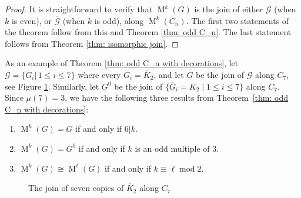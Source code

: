 \documentclass[12pt]{amsart}
\theoremstyle{definition}
\theoremstyle{remark}
\numberwithin{equation}{section}
\numberwithin{figure}{section}
\renewcommand{\mod}{\operatorname{mod}}
\newcommand{\M}{\operatorname{M}}
\begin{document}
\begin{proof}
    It is straightforward to verify that $\M^k(G)$ is the join of either $\mathcal{G}$ (when $k$ is even), or $\overline{\mathcal{G}}$ (when $k$ is odd), along $\M^k(C_n)$. The first two statements of the theorem follow from this and Theorem \ref{thm: odd C_n}. The last statement follows from Theorem \ref{thm: isomorphic join}.
\end{proof}

As an example of Theorem \ref{thm: odd C_n with decorations}, 
let $\mathcal{G}=\{G_i  | \, 1\leq i \leq 7\}$ where every $G_i = \overline{K}_2$, and let $G$ be the join of $\mathcal{G}$ along $C_7$, see Figure \ref{fig:Jonathan's "Dream Catcher" Graph}.
Similarly, let $G^0$ be the join of $\{\overline{G}_i = K_2 \mid  1\leq i \leq 7\}$ along $C_7$.
Since $\mu(7)=3$, we have the following three results from Theorem~\ref{thm: odd C_n with decorations}:
\begin{enumerate}
    \item $\M^k(G)=G$ if and only if $6|k$.
    \item $\M^k(G)=G^0$ if and only if $k$ is an odd multiple of $3$.
    \item $\M^k(G)\cong \M^\ell(G)$ if and only if $k\equiv\ell\mod 2$.
\end{enumerate}

\begin{figure}[h!]
        \centering
        \caption{The join of seven copies of $\overline{K}_2$ along $C_7$}
        \label{fig:Jonathan's "Dream Catcher" Graph}
    \end{figure}
\end{document}

